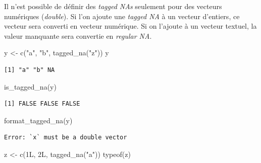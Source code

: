 \documentclass[
  letterpaper,
  DIV=11,
  numbers=noendperiod,
  oneside]{scrreprt}
\newenvironment{Shaded}{\begin{snugshade}}{\end{snugshade}}
\newcommand{\FunctionTok}[1]{\textcolor[rgb]{0.28,0.35,0.67}{#1}}
\newcommand{\NormalTok}[1]{\textcolor[rgb]{0.00,0.23,0.31}{#1}}
\newcommand{\OtherTok}[1]{\textcolor[rgb]{0.00,0.23,0.31}{#1}}
\newcommand{\StringTok}[1]{\textcolor[rgb]{0.13,0.47,0.30}{#1}}
\begin{document}
\begin{tcolorbox}[enhanced jigsaw, colbacktitle=quarto-callout-note-color!10!white, opacityback=0, toprule=.15mm, colback=white, coltitle=black, bottomtitle=1mm, toptitle=1mm, titlerule=0mm, rightrule=.15mm, title=\textcolor{quarto-callout-note-color}{\faInfo}\hspace{0.5em}{Note}, breakable, bottomrule=.15mm, opacitybacktitle=0.6, arc=.35mm, left=2mm, leftrule=.75mm, colframe=quarto-callout-note-color-frame]

Il n'est possible de définir des \emph{tagged NAs} seulement pour des
vecteurs numériques (\emph{double}). Si l'on ajoute une \emph{tagged NA}
à un vecteur d'entiers, ce vecteur sera converti en vecteur numérique.
Si on l'ajoute à un vecteur textuel, la valeur manquante sera convertie
en \emph{regular NA}.

\begin{Shaded}
\begin{Highlighting}[]
\NormalTok{y }\OtherTok{\textless{}{-}} \FunctionTok{c}\NormalTok{(}\StringTok{"a"}\NormalTok{, }\StringTok{"b"}\NormalTok{, }\FunctionTok{tagged\_na}\NormalTok{(}\StringTok{"z"}\NormalTok{))}
\NormalTok{y}
\end{Highlighting}
\end{Shaded}

\begin{verbatim}
[1] "a" "b" NA 
\end{verbatim}

\begin{Shaded}
\begin{Highlighting}[]
\FunctionTok{is\_tagged\_na}\NormalTok{(y)}
\end{Highlighting}
\end{Shaded}

\begin{verbatim}
[1] FALSE FALSE FALSE
\end{verbatim}

\begin{Shaded}
\begin{Highlighting}[]
\FunctionTok{format\_tagged\_na}\NormalTok{(y)}
\end{Highlighting}
\end{Shaded}

\begin{verbatim}
Error: `x` must be a double vector
\end{verbatim}

\begin{Shaded}
\begin{Highlighting}[]
\NormalTok{z }\OtherTok{\textless{}{-}} \FunctionTok{c}\NormalTok{(1L, 2L, }\FunctionTok{tagged\_na}\NormalTok{(}\StringTok{"a"}\NormalTok{))}
\FunctionTok{typeof}\NormalTok{(z)}
\end{Highlighting}
\end{Shaded}


\end{tcolorbox}
\end{document}
